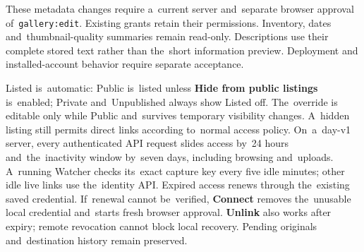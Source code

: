 \documentclass[11pt,a4paper]{article}
\newcommand{\ui}[1]{\textbf{#1}}
\begin{document}
These metadata changes require a~current server and~separate browser approval
of~\texttt{gallery:edit}. Existing grants retain their permissions. Inventory,
dates and~thumbnail-quality summaries remain read-only. Descriptions use their
complete stored text rather than the~short information preview. Deployment and
installed-account behavior require separate acceptance.

Listed is~automatic: Public is~listed unless \ui{Hide from public listings}
is~enabled; Private and~Unpublished always show Listed off. The~override is
editable only while Public and~survives temporary visibility changes.
A~hidden listing still permits direct links according to~normal access policy.
On~a~day-v1 server, every authenticated API request slides access by~24 hours
and~the~inactivity window by~seven days, including browsing and~uploads.
A~running Watcher checks its~exact capture key every five idle minutes;
other idle live links use the~identity API. Expired access renews through
the~existing saved credential. If~renewal cannot be~verified, \ui{Connect}
removes the~unusable local credential and~starts fresh browser approval.
\ui{Unlink} also works after expiry; remote revocation cannot block local
recovery. Pending originals and~destination history remain preserved.
\end{document}

